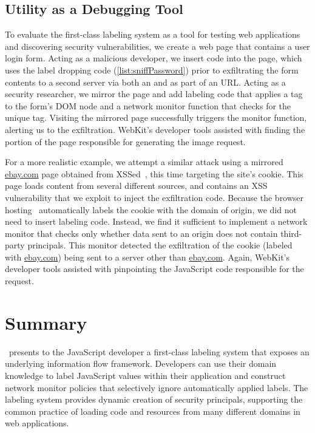 \subsection{Utility as a Debugging Tool}

To evaluate the first-class labeling system as a tool for testing web applications and discovering security vulnerabilities, we create a web page that contains a user login form.
Acting as a malicious developer, we insert code into the page, which uses the  label dropping code (\autoref{list:sniffPassword}) prior to exfiltrating the form contents to a second server via both an  and as part of an  URL.
Acting as a security researcher, we mirror the page and add labeling code that applies a tag to the form's DOM node and a network monitor function that checks for the unique tag.
Visiting the mirrored page successfully triggers the monitor function, alerting us to the exfiltration.
WebKit's developer tools assisted with finding the portion of the page responsible for generating the image request.

For a more realistic example, we attempt a similar attack using a mirrored \url{ebay.com} page obtained from XSSed~\cite{xssed}, this time targeting the site's cookie.
This page loads content from several different sources, and contains an XSS vulnerability that we exploit to inject the exfiltration code.
Because the browser hosting \JitFlow\ automatically labels the cookie with the domain of origin, we did not need to insert labeling code.
Instead, we find it sufficient to implement a network monitor that checks only whether data sent to an origin does not contain third-party principals.
This monitor detected the exfiltration of the cookie (labeled with \url{ebay.com}) being sent to a server other than \url{ebay.com}.
Again, WebKit's developer tools assisted with pinpointing the JavaScript code responsible for the request.


\section{Summary}
\label{sec:first-class-summar}

\JitFlow\ presents to the JavaScript developer a first-class labeling system that exposes an underlying information flow framework.
Developers can use their domain knowledge to label JavaScript values within their application and construct network monitor policies that selectively ignore automatically applied labels.
The labeling system provides dynamic creation of security principals, supporting the common practice of loading code and resources from many different domains in web applications.

